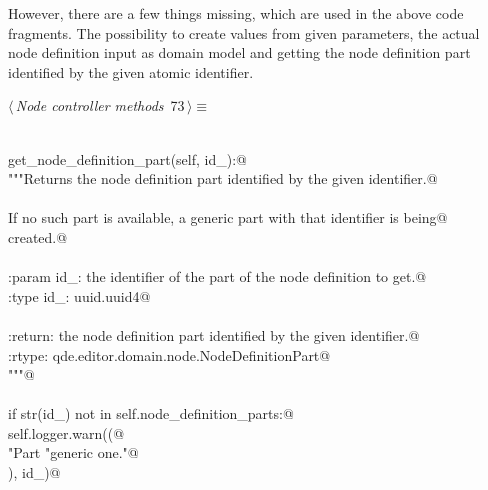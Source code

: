\documentclass[
    a4paper,      %
    10pt,         %
    openright,    %
    notitlepage,  %
    parskip=half, %
]{scrreprt}       %
\theoremstyle{definition}                    %
\begin{document}
However, there are a few things missing, which are used in the above code
fragments. The possibility to create values from given parameters, the actual
node definition input as domain model and getting the node definition part
identified by the given atomic identifier.

\begin{flushleft} \small
\begin{minipage}{\linewidth}\label{scrap118}\raggedright\small
{} $\langle\,${\itshape Node controller methods}\nobreak\ {\footnotesize {73}}$\,\rangle\equiv$
\vspace{-1exm}
\begin{list}{}{} \item
\mbox{}\lstinline@@\\
\mbox{}\lstinline@def get_node_definition_part(self, id_):@\\
\mbox{}\lstinline@    """Returns the node definition part identified by the given identifier.@\\
\mbox{}\lstinline@@\\
\mbox{}\lstinline@    If no such part is available, a generic part with that identifier is being@\\
\mbox{}\lstinline@    created.@\\
\mbox{}\lstinline@@\\
\mbox{}\lstinline@    :param id_: the identifier of the part of the node definition to get.@\\
\mbox{}\lstinline@    :type  id_: uuid.uuid4@\\
\mbox{}\lstinline@@\\
\mbox{}\lstinline@    :return: the node definition part identified by the given identifier.@\\
\mbox{}\lstinline@    :rtype: qde.editor.domain.node.NodeDefinitionPart@\\
\mbox{}\lstinline@    """@\\
\mbox{}\lstinline@@\\
\mbox{}\lstinline@    if str(id_) not in self.node_definition_parts:@\\
\mbox{}\lstinline@        self.logger.warn((@\\
\mbox{}\lstinline@            "Part %s of the node definition was not found. Creating a"@\\
\mbox{}\lstinline@            "generic one."@\\
\mbox{}\lstinline@        ), id_)@\\
\mbox{}\lstinline@@\\

\end{list}
\end{minipage}
\end{flushleft}
\end{document}
